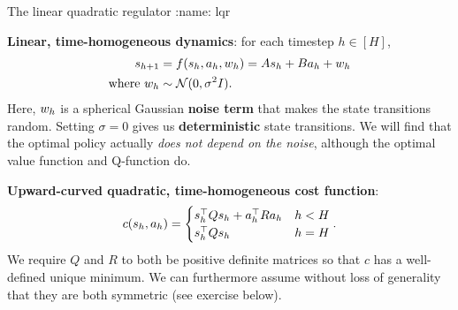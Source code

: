 \documentclass[\main/main]{subfiles}
\begin{document}
\begin{definition}{The linear quadratic regulator}
:name: lqr

    \textbf{Linear, time-homogeneous dynamics}: for each timestep $h \in [H]$,
    \begin{align*}
        s_{h+1} &= f(s_h, a_h, w_h) = A s_h + B a_h + w_h \\
        \text{where } w_h &\sim \mathcal{N}(0, \sigma^2 I).
    \end{align*}
    Here, $w_h$ is a spherical Gaussian \textbf{noise term} that makes the state transitions random.
    Setting $\sigma = 0$ gives us \textbf{deterministic} state transitions.
    We will find that the optimal policy actually \emph{does not depend on the noise}, although the optimal value function and Q-function do.

    \noindent \textbf{Upward-curved quadratic, time-homogeneous cost function}:
    \[
        c(s_h, a_h) = \begin{cases}
            s_h^\top Q s_h + a_h^\top R a_h & h < H \\
            s_h^\top Q s_h                            & h = H
        \end{cases}.
    \]
    We require $Q$ and $R$ to both be positive definite matrices so that $c$ has a well-defined unique minimum. We can furthermore assume without loss of generality that they are both symmetric (see exercise below).



\end{definition}
\end{document}
